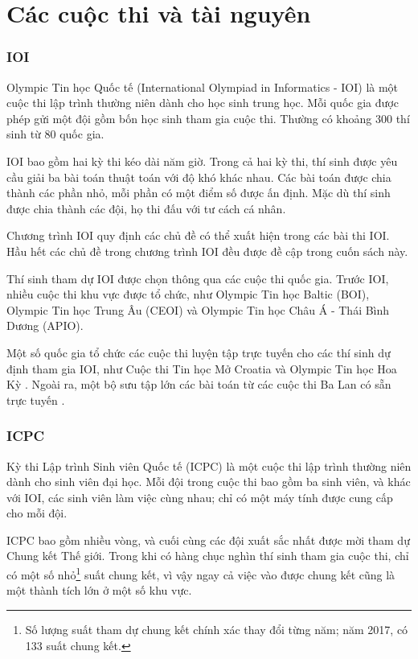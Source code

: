 \section{Các cuộc thi và tài nguyên}

\subsubsection{IOI}

Olympic Tin học Quốc tế (International Olympiad in Informatics - IOI)
là một cuộc thi lập trình thường niên dành cho
học sinh trung học.
Mỗi quốc gia được phép gửi một đội gồm
bốn học sinh tham gia cuộc thi.
Thường có khoảng 300 thí sinh
từ 80 quốc gia.

IOI bao gồm hai kỳ thi kéo dài năm giờ.
Trong cả hai kỳ thi, thí sinh được yêu cầu
giải ba bài toán thuật toán với độ khó khác nhau.
Các bài toán được chia thành các phần nhỏ,
mỗi phần có một điểm số được ấn định.
Mặc dù thí sinh được chia thành các đội,
họ thi đấu với tư cách cá nhân.

Chương trình IOI \cite{iois} quy định các chủ đề
có thể xuất hiện trong các bài thi IOI.
Hầu hết các chủ đề trong chương trình IOI
đều được đề cập trong cuốn sách này.

Thí sinh tham dự IOI được chọn thông qua
các cuộc thi quốc gia.
Trước IOI, nhiều cuộc thi khu vực được tổ chức,
như Olympic Tin học Baltic (BOI),
Olympic Tin học Trung Âu (CEOI)
và Olympic Tin học Châu Á - Thái Bình Dương (APIO).

Một số quốc gia tổ chức các cuộc thi luyện tập trực tuyến
cho các thí sinh dự định tham gia IOI,
như Cuộc thi Tin học Mở Croatia \cite{coci}
và Olympic Tin học Hoa Kỳ \cite{usaco}.
Ngoài ra, một bộ sưu tập lớn các bài toán từ các cuộc thi Ba Lan
có sẵn trực tuyến \cite{main}.

\subsubsection{ICPC}

Kỳ thi Lập trình Sinh viên Quốc tế (ICPC)
là một cuộc thi lập trình thường niên dành cho sinh viên đại học.
Mỗi đội trong cuộc thi bao gồm ba sinh viên,
và khác với IOI, các sinh viên làm việc cùng nhau;
chỉ có một máy tính được cung cấp cho mỗi đội.

ICPC bao gồm nhiều vòng, và cuối cùng các
đội xuất sắc nhất được mời tham dự Chung kết Thế giới.
Trong khi có hàng chục nghìn thí sinh
tham gia cuộc thi, chỉ có một số nhỏ\footnote{Số lượng suất tham dự chung kết chính xác
thay đổi từng năm; năm 2017, có 133 suất chung kết.} suất chung kết,
vì vậy ngay cả việc vào được chung kết
cũng là một thành tích lớn ở một số khu vực.

